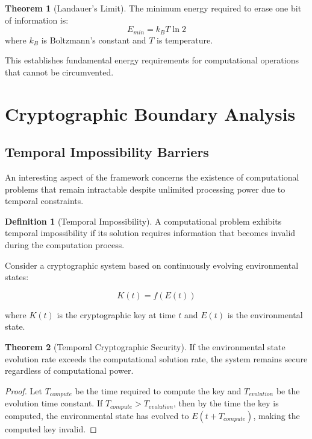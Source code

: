 \documentclass[12pt,a4paper]{article}
\theoremstyle{definition}
\newtheorem{definition}{Definition}[section]
\newtheorem{theorem}{Theorem}[section]
\begin{document}
{\begin{theorem}[Landauer's Limit]
The minimum energy required to erase one bit of information is:
\begin{equation}
E_{min} = k_B T \ln 2
\end{equation}
where $k_B$ is Boltzmann's constant and $T$ is temperature.
\end{theorem}

This establishes fundamental energy requirements for computational operations that cannot be circumvented.

\section{Cryptographic Boundary Analysis}

\subsection{Temporal Impossibility Barriers}

An interesting aspect of the framework concerns the existence of computational problems that remain intractable despite unlimited processing power due to temporal constraints.

\begin{definition}[Temporal Impossibility]
A computational problem exhibits temporal impossibility if its solution requires information that becomes invalid during the computation process.
\end{definition}

Consider a cryptographic system based on continuously evolving environmental states:

\begin{equation}
K(t) = f(E(t))
\end{equation}

where $K(t)$ is the cryptographic key at time $t$ and $E(t)$ is the environmental state.

\begin{theorem}[Temporal Cryptographic Security]
If the environmental state evolution rate exceeds the computational solution rate, the system remains secure regardless of computational power.
\end{theorem}

\begin{proof}
Let $T_{compute}$ be the time required to compute the key and $T_{evolution}$ be the evolution time constant. If $T_{compute} > T_{evolution}$, then by the time the key is computed, the environmental state has evolved to $E(t + T_{compute})$, making the computed key invalid.
\end{proof}

}
\end{document}
